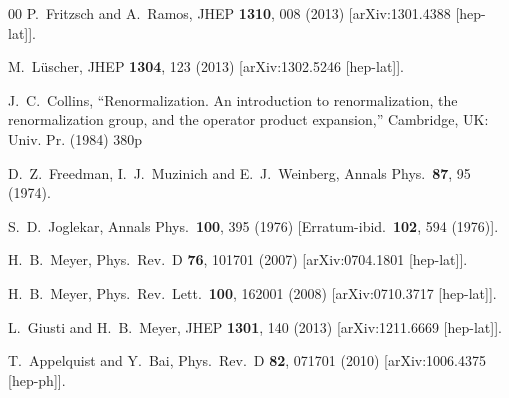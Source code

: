 \begin{thebibliography}{00}
  P.~Fritzsch and A.~Ramos,
  JHEP {\bf 1310}, 008 (2013)
  [arXiv:1301.4388 [hep-lat]].

  M.~L\"uscher,
  JHEP {\bf 1304}, 123 (2013)
  [arXiv:1302.5246 [hep-lat]].

  J.~C.~Collins,
  ``Renormalization. An introduction to renormalization, the renormalization group, and the operator product expansion,''
  Cambridge, UK: Univ. Pr. (1984) 380p

  D.~Z.~Freedman, I.~J.~Muzinich and E.~J.~Weinberg,
  Annals Phys.\  {\bf 87}, 95 (1974).

  S.~D.~Joglekar,
  Annals Phys.\  {\bf 100}, 395 (1976)
  [Erratum-ibid.\  {\bf 102}, 594 (1976)].

  H.~B.~Meyer,
  Phys.\ Rev.\ D {\bf 76}, 101701 (2007)
  [arXiv:0704.1801 [hep-lat]].

  H.~B.~Meyer,
  Phys.\ Rev.\ Lett.\  {\bf 100}, 162001 (2008)
  [arXiv:0710.3717 [hep-lat]].

  L.~Giusti and H.~B.~Meyer,
  JHEP {\bf 1301}, 140 (2013)
  [arXiv:1211.6669 [hep-lat]].

  T.~Appelquist and Y.~Bai,
  Phys.\ Rev.\ D {\bf 82}, 071701 (2010)
  [arXiv:1006.4375 [hep-ph]].

\end{thebibliography}
